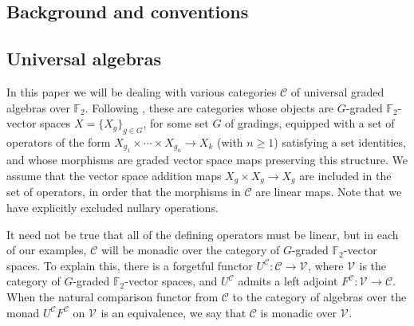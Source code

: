 \documentclass[11pt]{amsart} \renewcommand{\baselinestretch}{1.4}
\theoremstyle{plain}
\theoremstyle{definition}
\renewcommand{\to}{\longrightarrow}
\newcommand{\calV}{\mathcal{V}}
\newcommand{\calc}{\mathcal{C}}
\newcommand{\citeBOX}[2][]{\cite[\mbox{#1}]{#2}}
\newcommand{\vect}[2]{\calV^{#1}_{#2}}
\newcommand{\F}{\mathbb{F}}
\newcommand{\Ftwo}{\F_2}
\begin{document}
\begin{Conventions and notation}
\vfil\pagebreak
\section{\textbf{Background and conventions}}
\label{Conventions and notation}

\subsection{Universal algebras}
\label{Universal algebras}
In this paper we will be dealing with various categories $\calc$ of universal graded algebras over $\Ftwo $. Following \citeBOX[\S2.1]{Blanc_Stover-Groth_SS.pdf}, these are categories whose objects are $G$-graded $\Ftwo $-vector spaces $X=\{X_g\}_{g\in G}$, for some set $G$ of gradings, equipped with a set of operators of the form $X_{g_1}\times \cdots \times X_{g_n}\to X_k$ (with $n\geq1$)  satisfying a set identities, and whose morphisms are graded vector space maps preserving this structure. We assume that the vector space addition  maps $X_g\times X_g\to X_{g}$ are included in the set of operators, in order that the morphisms in $\calc$ are linear maps. Note that we have explicitly excluded nullary operations. 

It need not  be true that all of the defining operators must be linear, but in each of our examples, $\calc$ will be monadic over the category of $G$-graded $\Ftwo $-vector spaces. To explain this, there is a forgetful functor $U^\calc:\calc\to\vect{}{}$, where $\vect{}{}$ is the category of $G$-graded $\Ftwo $-vector spaces, and $U^{\calc}$ admits a left adjoint  $F^\calc:\vect{}{}\to\calc$. %
When the natural comparison functor from $\calc$ to the category of algebras over the monad $U^{\calc}F^{\calc}$ on $\vect{}{}$ is an equivalence, we say that $\calc$ is monadic over $\vect{}{}$.


\end{Conventions and notation}
\end{document}
